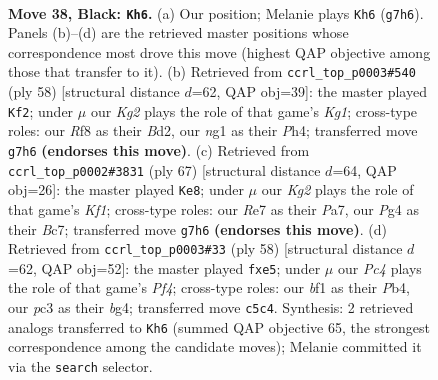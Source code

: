 \documentclass[11pt]{article}
\begin{document}
\clearpage

\begin{figure}[p]\centering
\begin{subfigure}{0.46\textwidth}\centering
\resizebox{\linewidth}{!}{%
\newchessgame
\chessboard[
  setfen={5r2/4r1k1/1p6/p1p1nb2/P5p1/1NP1R3/K5PP/5BNR b - - 5 38},
  showmover=false,
  pgfstyle=straightmove, color=movearrow, markmove={g7-h6}
]}
\caption{}
\end{subfigure}\hfill
\begin{subfigure}{0.46\textwidth}\centering
\resizebox{\linewidth}{!}{%
\newchessgame
\chessboard[
  setfen={2r1b1k1/8/p4pp1/2Nnp2p/PP5P/5P2/3B2P1/2R3K1 w - - 0 30},
  showmover=false,
  pgfstyle=straightmove, color=movearrow, markmove={g1-f2}
]}
\caption{}
\end{subfigure}
\\[4pt]
\begin{subfigure}{0.46\textwidth}\centering
\resizebox{\linewidth}{!}{%
\newchessgame
\chessboard[
  setfen={5k2/p1b2pp1/3r2p1/1p1nN3/3R3P/6P1/PP1B1P2/5K2 b - - 9 34},
  showmover=false,
  pgfstyle=straightmove, color=movearrow, markmove={f8-e8}
]}
\caption{}
\end{subfigure}\hfill
\begin{subfigure}{0.46\textwidth}\centering
\resizebox{\linewidth}{!}{%
\newchessgame
\chessboard[
  setfen={8/p1r1k2p/B4pp1/2N1p3/1P1n1PbP/P1R3P1/6K1/8 w - - 1 30},
  showmover=false,
  pgfstyle=straightmove, color=movearrow, markmove={f4-e5}
]}
\caption{}
\end{subfigure}
\caption{\textbf{Move 38, Black: \texttt{Kh6}.} (a) Our position; Melanie plays \texttt{Kh6} (\texttt{g7h6}). Panels (b)--(d) are the retrieved master positions whose correspondence most drove this move (highest QAP objective among those that transfer to it). (b) Retrieved from \texttt{ccrl\_top\_p0003\#540} (ply 58) [structural distance $d$=62, QAP obj=39]: the master played \texttt{Kf2}; under $\mu$ our \emph{Kg2} plays the role of that game's \emph{Kg1}; cross-type roles: our \emph{R}f8 as their \emph{B}d2, our \emph{n}g1 as their \emph{P}h4; transferred move \texttt{g7h6} \textbf{(endorses this move)}. (c) Retrieved from \texttt{ccrl\_top\_p0002\#3831} (ply 67) [structural distance $d$=64, QAP obj=26]: the master played \texttt{Ke8}; under $\mu$ our \emph{Kg2} plays the role of that game's \emph{Kf1}; cross-type roles: our \emph{R}e7 as their \emph{P}a7, our \emph{P}g4 as their \emph{B}c7; transferred move \texttt{g7h6} \textbf{(endorses this move)}. (d) Retrieved from \texttt{ccrl\_top\_p0003\#33} (ply 58) [structural distance $d$=62, QAP obj=52]: the master played \texttt{fxe5}; under $\mu$ our \emph{Pc4} plays the role of that game's \emph{Pf4}; cross-type roles: our \emph{b}f1 as their \emph{P}b4, our \emph{p}c3 as their \emph{b}g4; transferred move \texttt{c5c4}. Synthesis: 2 retrieved analogs transferred to \texttt{Kh6} (summed QAP objective 65, the strongest correspondence among the candidate moves); Melanie committed it via the \texttt{search} selector.}
\label{fig:thought-m75}
\end{figure}
\end{document}
